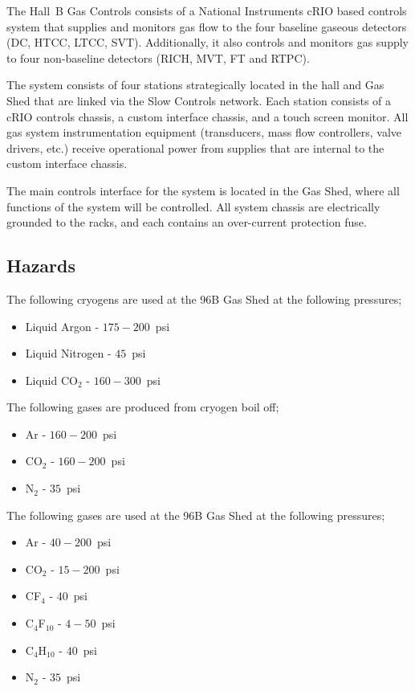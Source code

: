The Hall~B Gas Controls consists of a National Instruments cRIO based controls system 
that supplies and monitors gas flow to the four baseline gaseous detectors (DC, HTCC, 
LTCC, SVT). Additionally, it also controls and monitors gas supply to four non-baseline 
detectors (RICH, MVT, FT and RTPC). 

The system consists of four stations strategically located in the hall and Gas Shed that 
are linked via the Slow Controls network. Each station consists of a cRIO controls chassis, 
a custom interface chassis, and a touch screen monitor. All gas system instrumentation 
equipment (transducers, mass flow controllers, valve drivers, etc.) receive operational 
power from supplies that are internal to the custom interface chassis. 

The main controls interface for the system is located in the Gas Shed, where all functions 
of the system will be controlled. All system chassis are electrically grounded to the racks, 
and each contains an over-current protection fuse. 

\subsection{Hazards} 

The following cryogens are used at the 96B Gas Shed at the following pressures;
\begin{itemize}
\item Liquid Argon - $175 - 200$~psi
\item Liquid Nitrogen - $45$~psi
\item Liquid CO$_2$ - $160 - 300$~psi
\end{itemize}

The following gases are produced from cryogen boil off;

\begin{itemize}
\item Ar - $160 - 200$~psi
\item CO$_2$ - $160 - 200$~psi
\item N$_2$ - $35$~psi
\end{itemize}

The following gases are used at the 96B Gas Shed at the following pressures;

\begin{itemize}
\item Ar - $40 - 200$~psi
\item CO$_2$ - $15-200$~psi
\item CF$_4$ - $40$~psi
\item C$_4$F$_{10}$ - $4 - 50$~psi
\item C$_4$H$_{10}$ - $40$~psi
\item N$_2$ - $35$~psi
\end{itemize}

